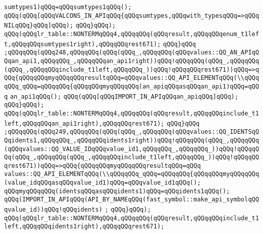 \verb|sumtypes1)qQQq=qQQqsumtypes1qQQq();|\newline
\verb|qQQq(qQQq[qQQqVALCONS_IN_APIqQQq{qQQqsumtypes,qQQqwith_typesqQQq=>qQQqNILqQQq}qQQq]qQQq);|\newline
\verb|qQQq}qQQq);|\newline
\verb|qQQq(qQQqlr_table::NONTERMqQQq4,qQQqqQQq(qQQqresult,qQQqqQQqenum_t1left,qQQqqQQqsumtypes1right),qQQqqQQqrest671);|\newline
\verb|qQQq}qQQq|\newline
\verb|;qQQqqQQq(qQQq248,qQQqqQQq(qQQq(qQQq_,qQQqqQQq(qQQqvalues::QQ_AN_APIqQQqan_api1,qQQqqQQq_,qQQqqQQqan_api1right))qQQq!qQQqqQQq(qQQq_,qQQqqQQq(qQQq_,qQQqqQQqinclude_t1left,qQQqqQQq_))qQQq!qQQqqQQqrest671))qQQq=>qQQq{qQQqqQQqmyqQQqqQQqresultqQQq=qQQqvalues::QQ_API_ELEMENTqQQq(\\qQQqqQQq_qQQq=qQQqqQQq{qQQqqQQqmyqQQqqQQq(an_apiqQQqasqQQqan_api1)qQQq=qQQq|\newline
\verb|an_api1qQQq();|\newline
\verb|qQQq(qQQq[qQQqIMPORT_IN_APIqQQqan_apiqQQq]qQQq);|\newline
\verb|qQQq}qQQq);|\newline
\verb|qQQq(qQQqlr_table::NONTERMqQQq4,qQQqqQQq(qQQqresult,qQQqqQQqinclude_t1left,qQQqqQQqan_api1right),qQQqqQQqrest671);|\newline
\verb|qQQq}qQQq|\newline
\verb|;qQQqqQQq(qQQq249,qQQqqQQq(qQQq(qQQq_,qQQqqQQq(qQQqvalues::QQ_IDENTSqQQqidents1,qQQqqQQq_,qQQqqQQqidents1right))qQQq!qQQqqQQq(qQQq_,qQQqqQQq(qQQqvalues::QQ_VALUE_IDqQQqvalue_id1,qQQqqQQq_,qQQqqQQq_))qQQq!qQQqqQQq(qQQq_,qQQqqQQq(qQQq_,qQQqqQQqinclude_t1left,qQQqqQQq_))qQQq!qQQqqQQqrest671))qQQq=>qQQq{qQQqqQQqmyqQQqqQQqresultqQQq=qQQq|\newline
\verb|values::QQ_API_ELEMENTqQQq(\\qQQqqQQq_qQQq=qQQqqQQq{qQQqqQQqmyqQQqqQQq(value_idqQQqasqQQqvalue_id1)qQQq=qQQqvalue_id1qQQq();|\newline
\verb|qQQqmyqQQqqQQq(identsqQQqasqQQqidents1)qQQq=qQQqidents1qQQq();|\newline
\verb|qQQq(IMPORT_IN_APIqQQq(API_BY_NAMEqQQq(fast_symbol::make_api_symbolqQQqvalue_id))qQQq!qQQqidents)|\newline
\verb|;|\newline
\verb|qQQq}qQQq);|\newline
\verb|qQQq(qQQqlr_table::NONTERMqQQq4,qQQqqQQq(qQQqresult,qQQqqQQqinclude_t1left,qQQqqQQqidents1right),qQQqqQQqrest671);|\newline

